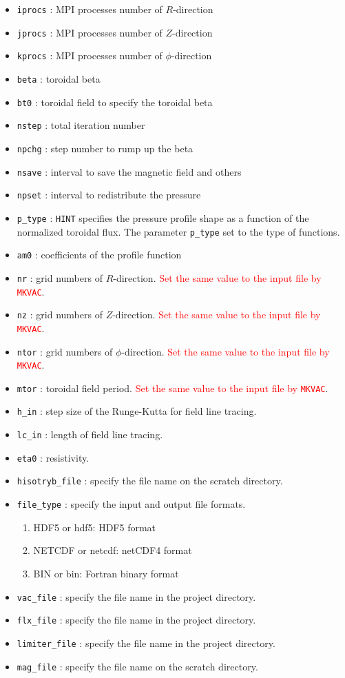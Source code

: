 \documentclass[10pt]{ltxdoc} %
\begin{document}
\begin{itemize}
 \item \texttt{iprocs} : MPI processes number of $R$-direction
 \item \texttt{jprocs} : MPI processes number of $Z$-direction
 \item \texttt{kprocs} : MPI processes number of $\phi$-direction
 \item \texttt{beta} : toroidal beta
 \item \texttt{bt0} : toroidal field to specify the toroidal beta
 \item \texttt{nstep} : total iteration number
 \item \texttt{npchg} : step number to rump up the beta
 \item \texttt{nsave} : interval to save the magnetic field and others
 \item \texttt{npset} : interval to redistribute the pressure
 \item \texttt{p\_type} : \texttt{HINT} specifies the pressure profile shape as a function of the normalized toroidal flux. The parameter \texttt{p\_type} set to the type of functions.
 \item \texttt{am0} : coefficients of the profile function
 \item \texttt{nr} : grid numbers of $R$-direction. \textcolor{red}{Set the same value to the input file by \texttt{MKVAC}}.
 \item \texttt{nz} : grid numbers of $Z$-direction. \textcolor{red}{Set the same value to the input file by \texttt{MKVAC}}.
 \item \texttt{ntor} : grid numbers of $\phi$-direction. \textcolor{red}{Set the same value to the input file by \texttt{MKVAC}}.
 \item \texttt{mtor} : toroidal field period. \textcolor{red}{Set the same value to the input file by \texttt{MKVAC}}.
 \item \texttt{h\_in} : step size of the Runge-Kutta for field line tracing.
 \item \texttt{lc\_in} : length of field line tracing.
 \item \texttt{eta0} : resistivity.
 \item \texttt{hisotryb\_file} : specify the file name on the scratch directory.
 \item \texttt{file\_type} : specify the input and output file formats.
  \begin{enumerate}
   \item  HDF5 or hdf5: HDF5 format
   \item NETCDF or netcdf: netCDF4 format
   \item BIN or bin: Fortran binary format
  \end{enumerate}
 \item \texttt{vac\_file} : specify the file name in the project directory.
 \item \texttt{flx\_file} : specify the file name in the project directory.
 \item \texttt{limiter\_file} : specify the file name in the project directory.
 \item \texttt{mag\_file} : specify the file name on the scratch directory.
\end{itemize}
\end{document}

